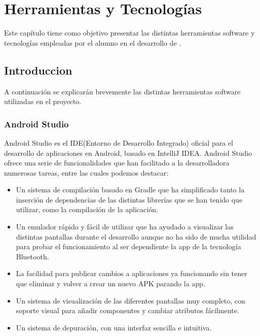 %
%
%



\cleardoublepage
\chapter{Herramientas y Tecnologías} \label{chap:Tecnologias} 

Este capítulo tiene como objetivo presentar las distintas herramientas software y tecnologías empleadas por el alumno en el desarrollo de \ULLNavigation{}.

\section{Introduccion}

A continuación se explicarán brevemente las distintas herramientas software utilizadas en el proyecto. 

\subsection{Android Studio}

Android Studio\cite{URL::AndroidStudio} es el IDE\cite{URL::IDE}(Entorno de Desarrollo Integrado) oficial para el desarrollo de aplicaciones en Android, basado en IntelliJ IDEA\cite{URL::IntelliJIDEA}. Android Studio ofrece una serie de funcionalidades que han facilitado a la desarrolladora numerosas tareas, entre las cuales podemos destacar:


\begin{itemize}
\item Un sistema de compilación basado en Gradle\cite{URL::Gradle} que ha simplificado tanto la inserción de dependencias de las distintas librerías que se han tenido que utilizar, como la compilación de la aplicación.
\item Un emulador rápido y fácil de utilizar que ha ayudado a visualizar las distintas pantallas durante el desarrollo aunque no ha sido de mucha utilidad para probar el funcionamiento al ser dependiente la app de la tecnología Bluetooth.
\item La facilidad para publicar cambios a aplicaciones ya funcionando sin tener que eliminar y volver a crear un nuevo APK parando la app.
\item Un sistema de visualización de las diferentes pantallas muy completo, con soporte visual para añadir componentes y cambiar atributos fácilmente.
\item Un sistema de depuración, con una interfaz sencilla e intuitiva.
\end{itemize} 


